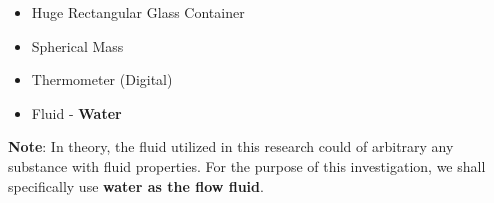 \begin{itemize}
    \item {Huge Rectangular Glass Container}
    \item {Spherical Mass}
    \item {Thermometer (Digital)}
    \item {Fluid - \textbf{Water}}
    \label{mat}
\end{itemize}

{\textbf{Note}: In theory, the fluid utilized in this research could of arbitrary any substance with fluid properties. For the purpose of this investigation, we shall specifically use \textbf{water as the flow fluid}.}


